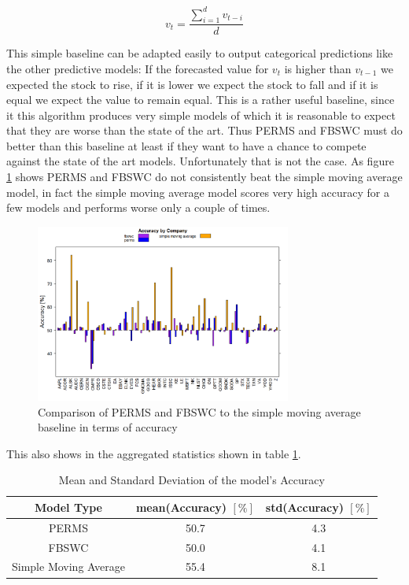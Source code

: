 \[v_t = \frac{\sum_{i=1}^d v_{t-i}}{d}\] 

This simple baseline can be adapted easily to output categorical predictions like the other predictive models: If the forecasted value for $v_t$ is higher than $v_{t-1}$ we expected the stock to rise, if it is lower we expect the stock to fall and if it is equal we expect the value to remain equal. This is a rather useful baseline, since it this algorithm produces very simple models of which it is reasonable to expect that they are worse than the state of the art. Thus PERMS and FBSWC must do better than this baseline at least if they want to have a chance to compete against the state of the art models. Unfortunately that is not the case. As figure \ref{fig_baselineComparisonBarchart} shows PERMS and FBSWC do not consistently beat the simple moving average model, in fact the simple moving average model scores very high accuracy for a few models and performs worse only a couple of times.

\begin{figure}[h]
	\centering
  	\includegraphics[width=0.75\textwidth]{baselineComparisonBarchart}
	\caption{Comparison of PERMS and FBSWC to the simple moving average baseline in terms of accuracy}
	\label{fig_baselineComparisonBarchart}
\end{figure}

This also shows in the aggregated statistics shown in table \ref{table_baselineAccuracy}. 

\begin{table}
\label{table_baselineAccuracy}	
\caption{Mean and Standard Deviation of the model's Accuracy}
\begin{tabular}{ c | c | c}		
  Model Type & mean(Accuracy) $[\%]$ & std(Accuracy) $[\%]$\\
  \hline
  PERMS & 50.7 & 4.3\\
  FBSWC & 50.0 & 4.1\\
  Simple Moving Average & 55.4 & 8.1\\
\end{tabular}
\end{table}

